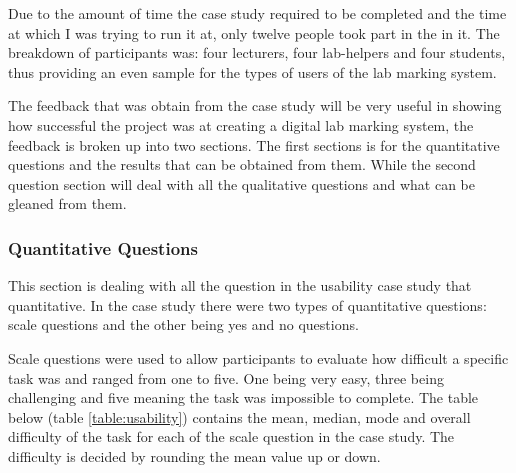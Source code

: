 \documentclass[12pt]{article}  %
\begin{document}
Due to the amount of time the case study required to be completed and the time at which I was trying to run it at, only twelve people took part in the in it. The breakdown of participants was: four lecturers, four lab-helpers and four students, thus providing an even sample for the types of users of the lab marking system.

The feedback that was obtain from the case study will be very useful in showing how successful the project was at creating a digital lab marking system, the feedback is broken up into two sections. The first sections is for the quantitative questions and the results that can be obtained from them. While the second question section will deal with all the qualitative questions and what can be gleaned from them. 



\subsubsection{Quantitative Questions}

This section is dealing with all the question in the usability case study that quantitative. In the case study there were two types of quantitative questions: scale questions and the other being  yes and no questions.

Scale questions were used to allow participants to evaluate how difficult a specific task was and ranged from one to five. One being very easy, three being challenging and five meaning the task was impossible to complete. 
The table below (table \ref{table:usability}) contains the mean, median, mode and overall difficulty of the task for each of the scale question in the case study. The difficulty is decided by rounding the mean value up or down.

\setlength\LTleft{0pt}
\setlength\LTright{0pt}
\end{document}
